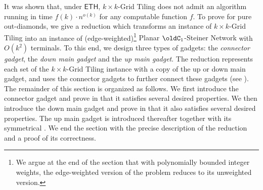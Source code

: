 It was shown \cite[Theorem 14.28]{10.5555/2815661} that, under $\mathsf{ETH}$, {\sc $k \times k$-Grid Tiling} does not admit an algorithm running in time $f(k)\cdot n^{o(k)}$ for any computable function $f$. 
To prove  for pure out-diamonds, 
we give a reduction which transforms an instance of {\sc $k \times k$-Grid Tiling} 
into an instance of (edge-weighted)\footnote{We argue at the end of the section that with polynomially bounded integer weights, the edge-weighted version of the problem reduces to its unweighted version.} {\sc Planar $\oldC_1$-Steiner Network} with $O(k^2)$ terminals.
To this end, we design three types of gadgets: 
the \emph{connector gadget}, the \emph{down main gadget} and the \emph{up main gadget}.
The reduction represents each set of the {\sc $k \times k$-Grid Tiling} instance with a copy of the up or down main gadget,
and uses the connector gadgets to further connect these gadgets (see ).
The remainder of this section is organized as follows.
We first introduce the connector gadget and prove in  that it satisfies several desired properties.
We then introduce the down main gadget and prove in  that it also satisfies several desired properties.
The up main gadget is introduced thereafter together with its symmetrical .
We end the section with the precise description of the reduction and a proof of its correctness.\\

